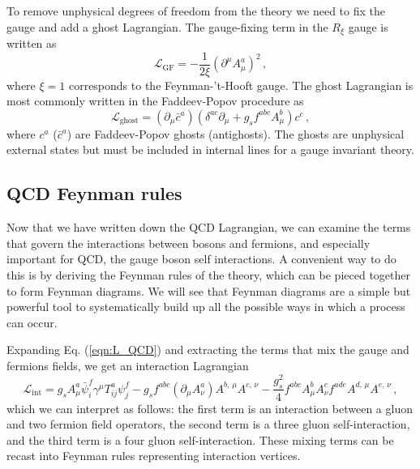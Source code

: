 \documentclass[main.tex]{subfiles}
\begin{document}
    To remove unphysical degrees of freedom from the
    theory we need to fix the gauge
    and add a ghost Lagrangian. The gauge-fixing term
    in the $R_{\xi}$ gauge is written as
    \begin{equation}\label{eqn:L_GF}
        \mathcal{L}_{\mathrm{GF}} = -\dfrac{1}{2\xi}(\partial^{\mu}A_{\mu}^{a})^{2} \, ,
    \end{equation}
    where $\xi = 1$ corresponds to the Feynman-'t-Hooft gauge.
    The ghost Lagrangian is most commonly written
    in the Faddeev-Popov procedure as
    \begin{equation}\label{eqn:L_ghost}
        \mathcal{L}_{\mathrm{ghost}} = (\partial_{\mu}\bar{c}^{a})(\delta^{ac}\partial_{\mu} + g_{s}f^{abc}A^{b}_{\mu})c^{c} \, ,
    \end{equation}
    where $c^{a}$ ($\bar{c}^{a}$) are Faddeev-Popov ghosts (antighosts).
    The ghosts are unphysical external states but must be
    included in internal lines for a gauge invariant theory.

    \subsection{QCD Feynman rules}\label{sec:qcd_feynman}
    Now that we have written down the QCD Lagrangian,
    we can examine the terms that govern the interactions between
    bosons and fermions, and especially
    important for QCD, the gauge boson self interactions. A convenient
    way to do this is by deriving the Feynman rules of the theory, which can be
    pieced together to form Feynman diagrams. We will see
    that Feynman diagrams are a simple but powerful tool
    to systematically build up all the possible ways in which a process
    can occur.

    Expanding Eq. (\ref{eqn:L_QCD}) and extracting the terms
    that mix the gauge and fermions fields, we get an interaction Lagrangian
    \begin{equation}\label{L_int}
        \mathcal{L}_{\mathrm{int}} = g_{s}A^{a}_{\mu}\bar{\psi}_{i}^{f}\gamma^{\mu}T^{a}_{ij}\psi_{j}^{f}-g_{s}f^{abc}(\partial_{\mu}A^{a}_{\nu})A^{b,\,\mu}A^{c,\,\nu} -\dfrac{g_{s}^{2}}{4}f^{abc}A^{b}_{\mu}A^{c}_{\nu}f^{ade}A^{d,\,\mu}A^{e,\,\nu} \, ,
    \end{equation}
    which we can interpret as follows: the first term
    is an interaction between a gluon and two fermion field operators,
    the second term is a three gluon
    self-interaction, and the third term is a four gluon
    self-interaction. These mixing terms can be recast
    into Feynman rules representing interaction vertices.
\end{document}
